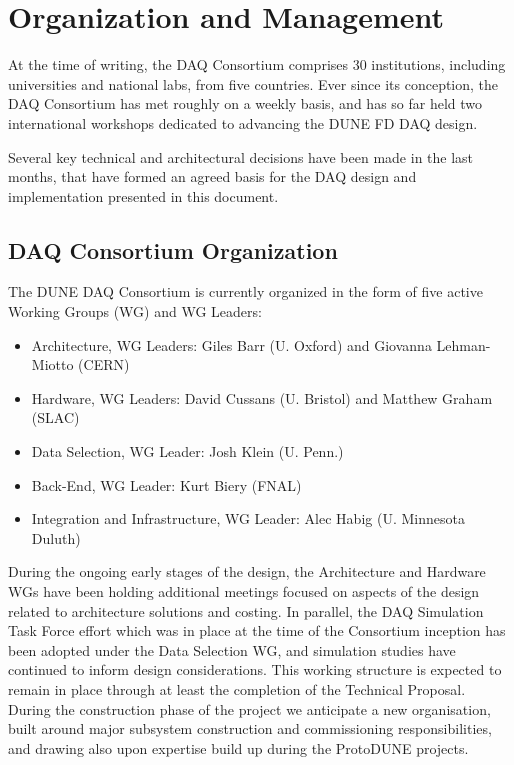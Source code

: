 
\section{Organization and Management}
\label{sec:fd-daq-org}

At the time of writing, the DAQ Consortium comprises 30 institutions, including universities and national labs, from five countries. Ever since its conception, the DAQ Consortium has met roughly on a weekly basis, and has so far held two international workshops dedicated to advancing the DUNE FD DAQ design.

Several key technical and architectural decisions have been made in the last months, that have formed an agreed basis for the DAQ design and implementation presented in this document.

\subsection{DAQ Consortium Organization}
\label{sec:fd-daq-org-consortium}

The DUNE DAQ Consortium is currently organized in the form of five active
Working Groups (WG) and WG Leaders:
\begin{itemize}
\item Architecture, WG Leaders: Giles Barr (U. Oxford) and Giovanna Lehman-Miotto (CERN)
\item Hardware, WG Leaders: David Cussans (U. Bristol) and Matthew Graham (SLAC)
\item Data Selection, WG Leader: Josh Klein (U. Penn.)
\item Back-End, WG Leader: Kurt Biery (FNAL)
\item Integration and Infrastructure, WG Leader: Alec Habig
  (U. Minnesota Duluth)
\end{itemize}

During the ongoing early stages of the design, the Architecture and Hardware WGs have been holding additional meetings focused on aspects of the design related to architecture solutions and costing. In parallel, the DAQ Simulation Task Force effort which was in place at the time of the Consortium inception has been adopted under the Data Selection WG, and simulation studies have continued to inform design considerations. This working structure is expected to remain in place through at least the completion of the Technical Proposal. During the construction phase of the project we anticipate a new organisation, built around major subsystem construction and commissioning responsibilities, and drawing also upon expertise build up during the ProtoDUNE projects.

